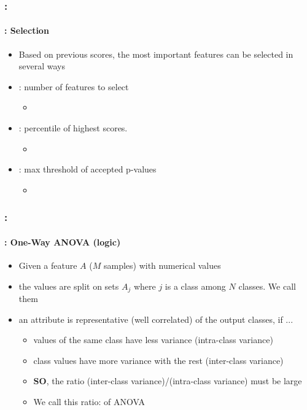 \documentclass[xcolor=table]{beamer}%
\begin{document}
\begin{frame}
	\frametitle{\insertshortsubtitle: \insertsection}
	\framesubtitle{\insertsubsection: Selection}
	
	\begin{itemize}
		\item Based on previous scores, the most important features can be selected in several ways
		\item {}: number of features to select
		\begin{itemize}
			\item {}
		\end{itemize}
		\item {}: percentile of highest scores.
		\begin{itemize}
			\item {}
		\end{itemize}
		\item {}: max threshold of accepted p-values
		\begin{itemize}
			\item {}
		\end{itemize}
	\end{itemize}
	
\end{frame}

\begin{frame}
	\frametitle{\insertshortsubtitle: \insertsection}
	\framesubtitle{\insertsubsection: One-Way ANOVA (logic)}
	
	\begin{itemize}
		\item Given a feature $A$ ($M$ samples) with numerical values
		\item the values are split on sets $A_j$ where $j$ is a class among $N$ classes. We call them 
		\item an attribute is representative (well correlated) of the output classes, if ...
		\begin{itemize}
			\item values of the same class have less variance (intra-class variance)
			\item class values have more variance with the rest (inter-class variance)
			\item \textbf{SO}, the ratio (inter-class variance)/(intra-class variance) must be large
			\item We call this ratio:  of ANOVA
		\end{itemize}
	\end{itemize}
	
\end{frame}
\end{document}

